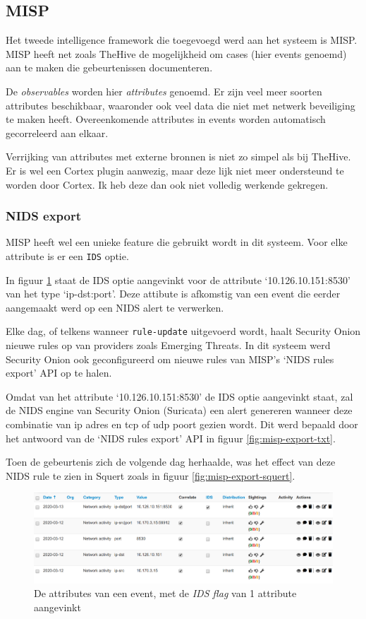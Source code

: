 \documentclass[a4paper,12pt]{report}
\begin{document}
\subsection{MISP}
Het tweede intelligence framework die toegevoegd werd aan het systeem is MISP.
MISP heeft net zoals TheHive de mogelijkheid om cases (hier events genoemd) aan te maken die gebeurtenissen documenteren.

De \emph{observables} worden hier \emph{attributes} genoemd.
Er zijn veel meer soorten attributes beschikbaar, waaronder ook veel data die niet met netwerk beveiliging te maken heeft.
Overeenkomende attributes in events worden automatisch gecorreleerd aan elkaar.

Verrijking van attributes met externe bronnen is niet zo simpel als bij TheHive.
Er is wel een Cortex plugin aanwezig, maar deze lijk niet meer ondersteund te worden door Cortex.
Ik heb deze dan ook niet volledig werkende gekregen.

\subsubsection{NIDS export}
MISP heeft wel een unieke feature die gebruikt wordt in dit systeem.
Voor elke attribute is er een \lstinline|IDS| optie.

In figuur \ref{fig:misp-export-flag} staat de IDS optie aangevinkt voor de attribute `10.126.10.151:8530' van het type `ip-dst:port'.
Deze attibute is afkomstig van een event die eerder aangemaakt werd op een NIDS alert te verwerken.

Elke dag, of telkens wanneer \lstinline|rule-update| uitgevoerd wordt, haalt Security Onion nieuwe rules op van providers zoals Emerging Threats.
In dit systeem werd Security Onion ook geconfigureerd om nieuwe rules van MISP's `NIDS rules export' API op te halen.

Omdat van het attribute `10.126.10.151:8530' de IDS optie aangevinkt staat, zal de NIDS engine van Security Onion (Suricata) een alert genereren wanneer deze combinatie van ip adres en tcp of udp poort gezien wordt.
Dit werd bepaald door het antwoord van de `NIDS rules export' API in figuur \ref{fig:misp-export-txt}.

Toen de gebeurtenis zich de volgende dag herhaalde, was het effect van deze NIDS rule te zien in Squert zoals in figuur \ref{fig:misp-export-squert}.

\begin{figure}[H]
  \centering
  \includegraphics[width=\textwidth]{misp-export-flag}
  \caption{De attributes van een event, met de \emph{IDS flag} van 1 attribute aangevinkt}
  \label{fig:misp-export-flag}
\end{figure}
\end{document}
